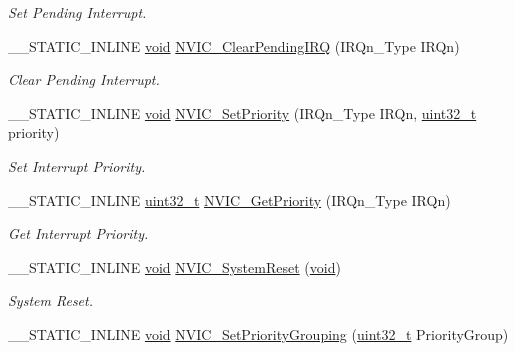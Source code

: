 \begin{DoxyCompactItemize}
\begin{DoxyCompactList}\small\item\em Set Pending Interrupt. \end{DoxyCompactList}\item 
\-\_\-\-\_\-\-S\-T\-A\-T\-I\-C\-\_\-\-I\-N\-L\-I\-N\-E \hyperlink{group___n_a_m_e_ga18028b8badbf1ea7e704ccac3c488e82}{void} \hyperlink{group___c_m_s_i_s___core___n_v_i_c_functions_ga332e10ef9605dc6eb10b9e14511930f8}{N\-V\-I\-C\-\_\-\-Clear\-Pending\-I\-R\-Q} (I\-R\-Qn\-\_\-\-Type I\-R\-Qn)
\begin{DoxyCompactList}\small\item\em Clear Pending Interrupt. \end{DoxyCompactList}\item 
\-\_\-\-\_\-\-S\-T\-A\-T\-I\-C\-\_\-\-I\-N\-L\-I\-N\-E \hyperlink{group___n_a_m_e_ga18028b8badbf1ea7e704ccac3c488e82}{void} \hyperlink{group___c_m_s_i_s___core___n_v_i_c_functions_ga2305cbd44aaad792e3a4e538bdaf14f9}{N\-V\-I\-C\-\_\-\-Set\-Priority} (I\-R\-Qn\-\_\-\-Type I\-R\-Qn, \hyperlink{stdint_8h_a435d1572bf3f880d55459d9805097f62}{uint32\-\_\-t} priority)
\begin{DoxyCompactList}\small\item\em Set Interrupt Priority. \end{DoxyCompactList}\item 
\-\_\-\-\_\-\-S\-T\-A\-T\-I\-C\-\_\-\-I\-N\-L\-I\-N\-E \hyperlink{stdint_8h_a435d1572bf3f880d55459d9805097f62}{uint32\-\_\-t} \hyperlink{group___c_m_s_i_s___core___n_v_i_c_functions_ga1cbaf8e6abd4aa4885828e7f24fcfeb4}{N\-V\-I\-C\-\_\-\-Get\-Priority} (I\-R\-Qn\-\_\-\-Type I\-R\-Qn)
\begin{DoxyCompactList}\small\item\em Get Interrupt Priority. \end{DoxyCompactList}\item 
\-\_\-\-\_\-\-S\-T\-A\-T\-I\-C\-\_\-\-I\-N\-L\-I\-N\-E \hyperlink{group___n_a_m_e_ga18028b8badbf1ea7e704ccac3c488e82}{void} \hyperlink{group___c_m_s_i_s___core___n_v_i_c_functions_ga1143dec48d60a3d6f238c4798a87759c}{N\-V\-I\-C\-\_\-\-System\-Reset} (\hyperlink{group___n_a_m_e_ga18028b8badbf1ea7e704ccac3c488e82}{void})
\begin{DoxyCompactList}\small\item\em System Reset. \end{DoxyCompactList}\item 
\-\_\-\-\_\-\-S\-T\-A\-T\-I\-C\-\_\-\-I\-N\-L\-I\-N\-E \hyperlink{group___n_a_m_e_ga18028b8badbf1ea7e704ccac3c488e82}{void} \hyperlink{group___c_m_s_i_s___core___n_v_i_c_functions_ga77cfbb35a9d8027e392034321bed6904}{N\-V\-I\-C\-\_\-\-Set\-Priority\-Grouping} (\hyperlink{stdint_8h_a435d1572bf3f880d55459d9805097f62}{uint32\-\_\-t} Priority\-Group)

\end{DoxyCompactItemize}

